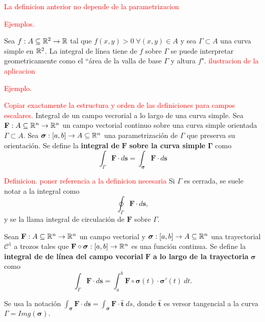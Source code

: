 \begin{obs} \textcolor{red}{La definicion anterior no depende de la parametrizacion }
\end{obs} 


\textcolor{red}{Ejemplos.}

\begin{obs} 
 Sea $f:A\subseteq\mathbb{R}^2 \to\mathbb{R}$   tal que  $f(x,y)>0 \; \forall (x,y) \in A$ y   sea $\Gamma \subset A$ una curva simple en $\mathbb{R}^2$.   La integral de l\'inea tiene de $f$ sobre $\Gamma$  se puede interpretar geometricamente como el ``\'area de la valla de base $\Gamma$ y altura $f$". 
\textcolor{red}{ilustracion de la aplicacion}
\end{obs}

\textcolor{red}{Ejemplo.}

\begin{definition}
 \textcolor{red}{Copiar exactamente la estructura y orden  de las definiciones para campos escalares.}     Integral de un campo vecrorial a lo largo de una curva simple.
    Sea $\mathbf{F}:A\subseteq\mathbb{R}^n\to\mathbb{R}^n$ un campo vectorial continuo sobre una curva simple orientada $\Gamma\subset A$. Sea $\boldsymbol{\sigma}:[a,b]\to A\subseteq\mathbb{R}^n$ una parametrizaci\'on de $\Gamma$ que preserva su orientaci\'on. Se define la \textbf{integral de} $\mathbf{F}$ \textbf{sobre la curva simple} $\boldsymbol{\Gamma}$ como
    \[
        \int_{\Gamma}\mathbf{F}\cdot d\mathbf{s}=\int_{\boldsymbol{\sigma}}\mathbf{F}\cdot d\mathbf{s} 
    \]
\end{definition}

\textcolor{red}{Definicion. poner referencia a la definicion necesaria} Si $\Gamma$  es cerrada,  se suele notar a la integral como
\[
    \oint_{\Gamma}\mathbf{F}\cdot d\mathbf{s},  
\]  y se la llama integral de circulaci\'on de $\mathbf{F}$ sobre $\Gamma$.





\begin{definition}
    Sean $\mathbf{F}:A\subseteq\mathbb{R}^n\to\mathbb{R}^n$ un campo vectorial y $\boldsymbol{\sigma}:[a,b]\to A\subseteq\mathbb{R}^n$ una trayectorial $\mathcal{C}^1$ a trozos tales que $\mathbf{F}\circ\boldsymbol{\sigma}:[a,b]\to\mathbb{R}^n$ es una funci\'on continua. Se define la \textbf{integral de de l\'inea del campo vecorial} $\mathbf{F}$ \textbf{a lo largo de la trayectoria} $\boldsymbol{\sigma}$ como
    \[
        \int_{\Gamma}\mathbf{F}\cdot d\mathbf{s}=\int_a^b\mathbf{F}\circ\boldsymbol{\sigma}(t)\cdot\boldsymbol{\sigma}'(t)\:dt. 
    \]
\end{definition}

Se usa la notaci\'on $\int_{\boldsymbol{\sigma}}\mathbf{F}\cdot d\mathbf{s}=\int_{\boldsymbol{\sigma}}\mathbf{F}\cdot\hat{\mathbf{t}}\:ds$,  donde $\hat{\mathbf{t}}$ es versor tangencial a la curva  $\Gamma = Img(\boldsymbol{\sigma}).$
